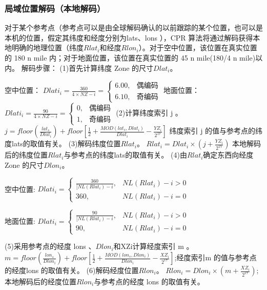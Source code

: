 \subsubsection{局域位置解码（本地解码）}
对于某个参考点（参考点可以是由全球解码确认的以前跟踪的某个位置，也可以是本机的位置，假定其纬度和经度分别为lats、lons ），CPR 算法将通过解码获得本地明确的地理位置（纬度$Rlat_i$和经度$Rlon_i$）。对于空中位置，该位置在真实位置的 180 n mile 内；对于地面位置，该位置在真实位置的 45 n mile(180/4 n mile)以内。\newline
解码步骤：\newline 
(1)首先计算纬度 Zone 的尺寸$Dlat_i$。\newline

空中位置：	
$Dlati_i=\frac{360}{4\times NZ-i}= \begin{cases} 6.00, & \mbox{偶编码} \\ 6.10, & \mbox{奇编码} \end{cases}$\newline
地面位置：
$Dlati_i=\frac{90}{4\times NZ-i}= \begin{cases} 0, & \mbox{偶编码} \\ 1, & \mbox{奇编码} \end{cases}$\newline
(2)计算纬度索引 j 。\newline
$j=floor(\frac{lat_s}{Dlat_i})+floor[\frac{1}{2}+\frac{MOD(lat_s,Dlat_i)}{Dlat_i}-\frac{YZ_i}{2^17}]$
纬度索引 j 的值与参考点的纬度lats的取值有关。\newline 
(3)解码纬度位置$Rlat_i$。\newline
$Rlat_i=Dlat_i\times(j+\frac{YZ_i}{2^{17}})$
本地解码后的纬度位置$Rlat_i$与参考点的纬度lats的取值有关。\newline 
(4)由$Rlat_i$确定东西向经度 Zone 的尺寸$Dlon_i$。\newline

空中位置:
$Dlati_i= \begin{cases} \frac{360}{[NL(Rlat_i)-i}, & NL(Rlat_i)-i>0 \\ 360, & NL(Rlat_i)-i=0 \end{cases}$\newline

地面位置:
$Dlati_i= \begin{cases} \frac{90}{[NL(Rlat_i)-i}, & NL(Rlat_i)-i>0 \\ 90, & NL(Rlat_i)-i=0 \end{cases}$\newline

(5)采用参考点的经度 lons 、$Dlon_i$和XZi计算经度索引 m 。\newline
$m=floor(\frac{lon_s}{Dlon_i})+floor[\frac{1}{2}+\frac{MOD(lon_s,Dlon_i)}{Dlon_i}-\frac{XZ_i}{2^{17}}]$;经度索引m 的值与参考点的经度lons 的取值有关。\newline 
(6)解码经度位置$Rlon_i$。\newline
$Rlon_i=Dlon_i\times(m+\frac{XZ_i}{2^{17}})$;本地解码后的经度位置$Rlon_i$与参考点的经度 lons 的取值有关。 

